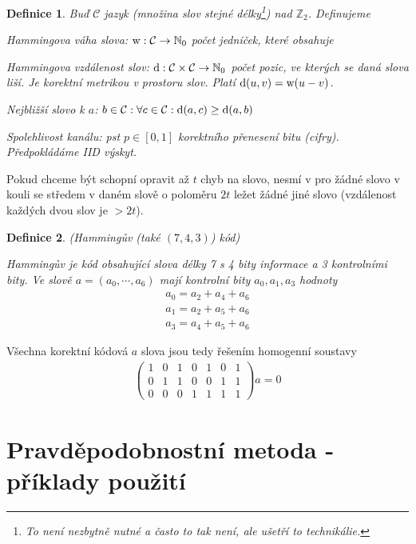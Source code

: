 \documentclass[a4paper,10pt,titlepage]{article} \usepackage[utf8]{inputenc}
\newtheorem{define}{Definice}
\begin{document}
\begin{define}
Buď $\mathcal{C}$ jazyk (množina slov stejné délky\footnote{To není nezbytně nutné a často to tak není, ale ušetří to technikálie.}) nad $\mathbb{Z}_2$. Definujeme

Hammingova váha slova: $\textup{w}: \mathcal{C} \rightarrow \mathbb{N}_0$ počet jedniček, které obsahuje

Hammingova vzdálenost slov: $\textup{d}: \mathcal{C}\times\mathcal{C} \rightarrow \mathbb{N}_0$ počet pozic, ve kterých se daná slova liší. Je korektní metrikou v prostoru slov. Platí $\textup{d}(u, v) = \textup{w}(u - v)$.

Nejbližší slovo k $a$: $b \in \mathcal{C}: \forall c \in \mathcal{C}: \textup{d}(a, c) \geq \textup{d}(a, b)$

Spolehlivost kanálu: pst $p \in [0,1]$ korektního přenesení bitu (cifry). Předpokládáme IID výskyt.
\end{define}

Pokud chceme být schopní opravit až $t$ chyb na slovo, nesmí v pro žádné slovo v kouli se středem v daném slově o poloměru $2t$ ležet žádné jiné slovo (vzdálenost každých dvou slov je $> 2t$).


\begin{define}
(Hammingův (také $(7, 4, 3)$) kód)

Hammingův je kód obsahující slova délky 7 s 4 bity informace a 3 kontrolními bity. Ve slově $a = (a_0, \cdots, a_6)$ mají kontrolní bity $a_0, a_1, a_3$ hodnoty
\begin{align*}
a_0 = a_2 + a_4 + a_6 \\
a_1 = a_2 + a_5 + a_6 \\
a_3 = a_4 + a_5 + a_6
\end{align*}
\end{define}

Všechna korektní kódová $a$ slova jsou tedy řešením homogenní soustavy
\begin{align*}
\begin{pmatrix}
1  & 0   & 1 &  0 &  1 &  0 &  1 \\
0  & 1  & 1  & 0  & 0  & 1  & 1 \\
0  & 0 &  0  & 1  & 1  & 1  & 1
\end{pmatrix}a=0
\end{align*}

\medskip

\section{Pravděpodobnostní metoda - příklady použití}
\end{document}
